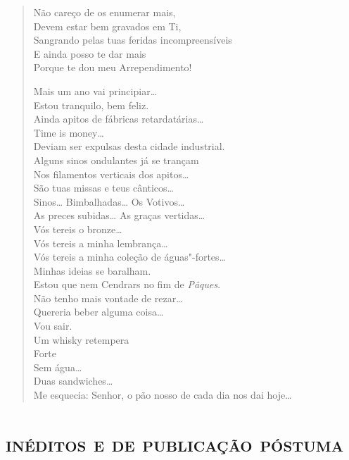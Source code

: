 {\begin{verse}
Não careço de os enumerar mais,\\
Devem estar bem gravados em Ti,\\
Sangrando pelas tuas feridas incompreensíveis\\
E ainda posso te dar mais\\
Porque te dou meu Arrependimento!

Mais um ano vai principiar\ldots{}\\
Estou tranquilo, bem feliz.\\
Ainda apitos de fábricas retardatárias\ldots{}\\
\qquad\qquad\qquad\qquad\quad Time is money\ldots{}\\
\qquad Deviam ser expulsas desta cidade industrial.\\
Alguns sinos ondulantes já se trançam\\
Nos filamentos verticais dos apitos\ldots{}\\
São tuas missas e teus cânticos\ldots{}\\
Sinos\ldots{} Bimbalhadas\ldots{} Os Votivos\ldots{}\\
As preces subidas\ldots{} As graças vertidas\ldots{}\\
Vós tereis o bronze\ldots{}\\
\qquad Vós tereis a minha lembrança\ldots{}\\
\qquad\qquad Vós tereis a minha coleção de águas"-fortes\ldots{}\\
Minhas ideias se baralham.\\
Estou que nem Cendrars no fim de \emph{Pâques}.\\
Não tenho mais vontade de rezar\ldots{}\\
Quereria beber alguma coisa\ldots{}\\
Vou sair.\\
Um whisky retempera\\
\qquad Forte\\
\qquad Sem água\ldots{}\\
Duas sandwiches\ldots{}\\
Me esquecia: Senhor, o pão nosso de cada dia nos dai hoje\ldots{}
\end{verse}

\movetooddpage
{}
\part*{\textsc{inéditos e de publicação póstuma}}

}

